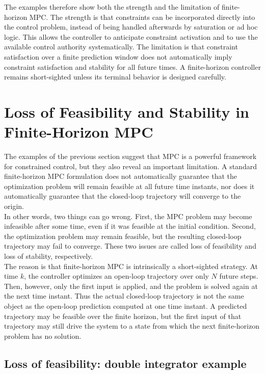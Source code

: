 The examples therefore show both the strength and the limitation of finite-horizon MPC. The
strength is that constraints can be incorporated directly into the control problem, instead of
being handled afterwards by saturation or ad hoc logic. This allows the controller to anticipate
constraint activation and to use the available control authority systematically. The limitation is
that constraint satisfaction over a finite prediction window does not automatically imply
constraint satisfaction and stability for all future times. A finite-horizon controller remains
short-sighted unless its terminal behavior is designed carefully.

\section{Loss of Feasibility and Stability in Finite-Horizon MPC}

The examples of the previous section suggest that MPC is a powerful framework for constrained
control, but they also reveal an important limitation. A standard finite-horizon MPC formulation
does not automatically guarantee that the optimization problem will remain feasible at all future
time instants, nor does it automatically guarantee that the closed-loop trajectory will converge
to the origin.\\

In other words, two things can go wrong. First, the MPC problem may become infeasible after
some time, even if it was feasible at the initial condition. Second, the optimization problem may
remain feasible, but the resulting closed-loop trajectory may fail to converge. These two issues
are called loss of feasibility and loss of stability, respectively.\\

The reason is that finite-horizon MPC is intrinsically a short-sighted strategy. At time \(k\), the
controller optimizes an open-loop trajectory over only \(N\) future steps. Then, however, only the
first input is applied, and the problem is solved again at the next time instant. Thus the actual
closed-loop trajectory is not the same object as the open-loop prediction computed at one time
instant. A predicted trajectory may be feasible over the finite horizon, but the first input of that
trajectory may still drive the system to a state from which the next finite-horizon problem has
no solution.

\subsection{Loss of feasibility: double integrator example}

